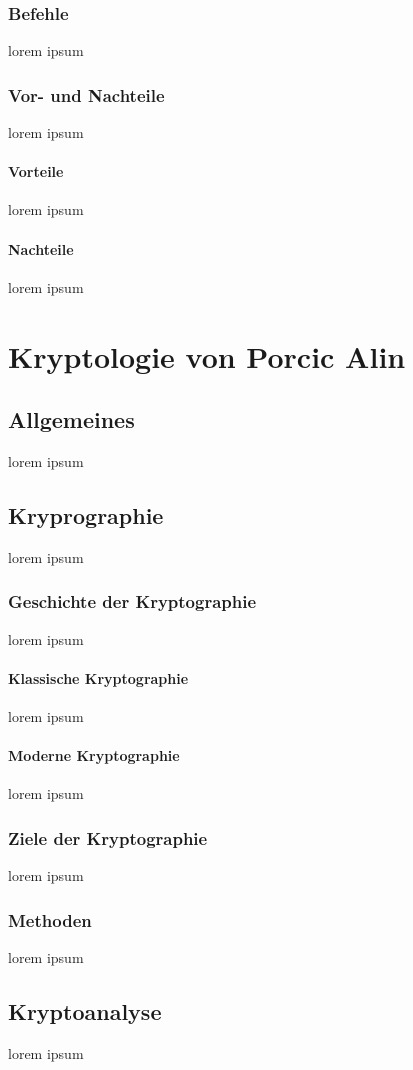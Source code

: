 \documentclass[10pt,a4paper]{report}
\begin{document}
\subsubsection{Befehle}
lorem ipsum
\subsubsection{Vor- und Nachteile}
lorem ipsum
\paragraph{Vorteile}
lorem ipsum
\paragraph{Nachteile}
lorem ipsum
\section{Kryptologie von Porcic Alin}
\subsection{Allgemeines}
lorem ipsum
\subsection{Kryprographie}
lorem ipsum
\subsubsection{Geschichte der Kryptographie}
lorem ipsum
\paragraph{Klassische Kryptographie}
lorem ipsum
\paragraph{Moderne Kryptographie}
lorem ipsum
\subsubsection{Ziele der Kryptographie}
lorem ipsum
\subsubsection{Methoden}
lorem ipsum
\subsection{Kryptoanalyse}
lorem ipsum
\end{document}
